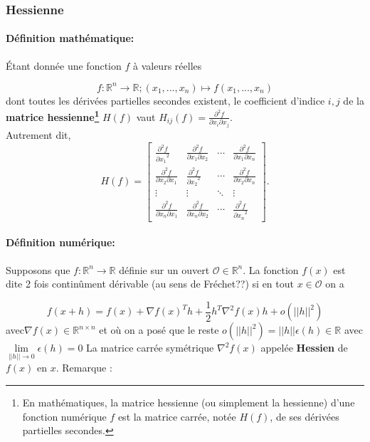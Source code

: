		
		
			
	\subsubsection{\textbf{Hessienne}}
		\paragraph*{Définition mathématique:}
		Étant donnée une fonction ${f}$ à valeurs réelles
		
		$${ f:\mathbb{R}^{n}\to \mathbb {R} ;(x_{1},...,x_{n})\mapsto f(x_{1},...,x_{n})}$$
		dont toutes les dérivées partielles secondes existent, le coefficient d'indice ${ i,j}$ de la \textbf{matrice hessienne\footnote{En mathématiques, la matrice hessienne (ou simplement la hessienne) d'une fonction numérique $f$ est la matrice carrée, notée $H(f)$, de ses dérivées partielles secondes.}} ${H(f)}$ vaut ${H_{ij}(f)={\frac {\partial ^{2}f}{\partial x_{i}\partial x_{j}}}}$.\\
		Autrement dit,
		$$
		{ H(f)={
			\begin{bmatrix}{
				\frac {\partial ^{2}f}{{\partial x_{1}}^{2}}}&{\frac {\partial ^{2}f}{\partial x_{1}\partial x_{2}}}&\cdots &{\frac {\partial ^{2}f}{\partial x_{1}\partial x_{n}}}\\
				{\frac {\partial ^{2}f}{\partial x_{2}\partial x_{1}}}&{\frac {\partial ^{2}f}{{\partial x_{2}}^{2}}}&\cdots &{\frac {\partial ^{2}f}{\partial x_{2}\partial x_{n}}}\\
				\vdots &\vdots &\ddots &\vdots \\
				{\frac {\partial ^{2}f}{\partial x_{n}\partial x_{1}}}&{\frac {\partial ^{2}f}{\partial x_{n}\partial x_{2}}}&\cdots &{\frac {\partial ^{2}f}{{\partial x_{n}}^{2}}}
			\end{bmatrix}}} .
		$$
		
		\paragraph*{Définition numérique:}
		Supposons que $f : \mathbb{R}^{n} \to \mathbb{R}$ définie sur un ouvert $\mathcal{O} \in \mathbb{R}^{n}$. La fonction $f(x)$ est dite 2
		fois continûment dérivable (au sens de Fréchet??) si en tout $x \in \mathcal{O}$ on a
		
		\begin{equation}
			f(x + h) = f(x)+\nabla f(x)^Th + \frac{1}{2}h^T\nabla^2f(x)h+o(||h||^2)
		\end{equation}
		avec$\nabla f(x)\in \mathbb{R}^{n\times n}$ et où on a posé que le reste 
		$ o(||h||^2) =||h|| \epsilon(h) \in \mathbb{R} $ avec 
		$\lim\limits_{||h|| \to 0} \epsilon(h) = 0 $
		La matrice carrée symétrique $\nabla^2 f(x)$ appelée \textbf{Hessien} de $f(x)$ en $x$. Remarque :
		
